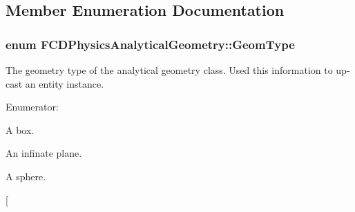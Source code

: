 \subsection{Member Enumeration Documentation}
\hypertarget{classFCDPhysicsAnalyticalGeometry_a511583406e5c6a1bb5bd84c0453a452c}{
\subsubsection[{GeomType}]{\setlength{\rightskip}{0pt plus 5cm}enum {\bf FCDPhysicsAnalyticalGeometry::GeomType}}}
\label{classFCDPhysicsAnalyticalGeometry_a511583406e5c6a1bb5bd84c0453a452c}
The geometry type of the analytical geometry class. Used this information to up-\/cast an entity instance. \begin{Desc}
\item[Enumerator: ]\par
\begin{description}
\item[{\em 
\hypertarget{classFCDPhysicsAnalyticalGeometry_a511583406e5c6a1bb5bd84c0453a452cae83cea13f5c459f83e3b83f26f7bedaa}{
BOX}
\label{classFCDPhysicsAnalyticalGeometry_a511583406e5c6a1bb5bd84c0453a452cae83cea13f5c459f83e3b83f26f7bedaa}
}]A box. \item[{\em 
\hypertarget{classFCDPhysicsAnalyticalGeometry_a511583406e5c6a1bb5bd84c0453a452caefa79f8ac87976e3a75852cacc69d246}{
PLANE}
\label{classFCDPhysicsAnalyticalGeometry_a511583406e5c6a1bb5bd84c0453a452caefa79f8ac87976e3a75852cacc69d246}
}]An infinate plane. \item[{\em 
\hypertarget{classFCDPhysicsAnalyticalGeometry_a511583406e5c6a1bb5bd84c0453a452ca1050722190aec6e9bf2f8cb13d735858}{
SPHERE}
\label{classFCDPhysicsAnalyticalGeometry_a511583406e5c6a1bb5bd84c0453a452ca1050722190aec6e9bf2f8cb13d735858}
}]A sphere. \item[{\em 
}
\end{description}
\end{Desc}
